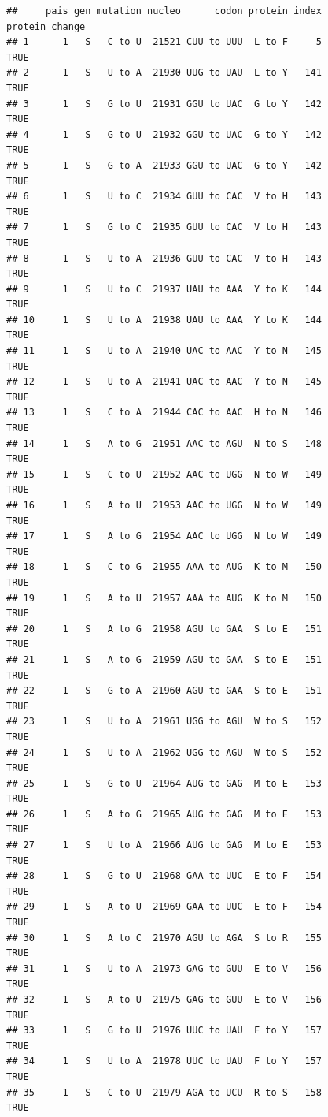 \documentclass[
  12pt,
]{article}
\begin{document}
\begin{verbatim}
##     pais gen mutation nucleo      codon protein index protein_change
## 1      1   S   C to U  21521 CUU to UUU  L to F     5           TRUE
## 2      1   S   U to A  21930 UUG to UAU  L to Y   141           TRUE
## 3      1   S   G to U  21931 GGU to UAC  G to Y   142           TRUE
## 4      1   S   G to U  21932 GGU to UAC  G to Y   142           TRUE
## 5      1   S   G to A  21933 GGU to UAC  G to Y   142           TRUE
## 6      1   S   U to C  21934 GUU to CAC  V to H   143           TRUE
## 7      1   S   G to C  21935 GUU to CAC  V to H   143           TRUE
## 8      1   S   U to A  21936 GUU to CAC  V to H   143           TRUE
## 9      1   S   U to C  21937 UAU to AAA  Y to K   144           TRUE
## 10     1   S   U to A  21938 UAU to AAA  Y to K   144           TRUE
## 11     1   S   U to A  21940 UAC to AAC  Y to N   145           TRUE
## 12     1   S   U to A  21941 UAC to AAC  Y to N   145           TRUE
## 13     1   S   C to A  21944 CAC to AAC  H to N   146           TRUE
## 14     1   S   A to G  21951 AAC to AGU  N to S   148           TRUE
## 15     1   S   C to U  21952 AAC to UGG  N to W   149           TRUE
## 16     1   S   A to U  21953 AAC to UGG  N to W   149           TRUE
## 17     1   S   A to G  21954 AAC to UGG  N to W   149           TRUE
## 18     1   S   C to G  21955 AAA to AUG  K to M   150           TRUE
## 19     1   S   A to U  21957 AAA to AUG  K to M   150           TRUE
## 20     1   S   A to G  21958 AGU to GAA  S to E   151           TRUE
## 21     1   S   A to G  21959 AGU to GAA  S to E   151           TRUE
## 22     1   S   G to A  21960 AGU to GAA  S to E   151           TRUE
## 23     1   S   U to A  21961 UGG to AGU  W to S   152           TRUE
## 24     1   S   U to A  21962 UGG to AGU  W to S   152           TRUE
## 25     1   S   G to U  21964 AUG to GAG  M to E   153           TRUE
## 26     1   S   A to G  21965 AUG to GAG  M to E   153           TRUE
## 27     1   S   U to A  21966 AUG to GAG  M to E   153           TRUE
## 28     1   S   G to U  21968 GAA to UUC  E to F   154           TRUE
## 29     1   S   A to U  21969 GAA to UUC  E to F   154           TRUE
## 30     1   S   A to C  21970 AGU to AGA  S to R   155           TRUE
## 31     1   S   U to A  21973 GAG to GUU  E to V   156           TRUE
## 32     1   S   A to U  21975 GAG to GUU  E to V   156           TRUE
## 33     1   S   G to U  21976 UUC to UAU  F to Y   157           TRUE
## 34     1   S   U to A  21978 UUC to UAU  F to Y   157           TRUE
## 35     1   S   C to U  21979 AGA to UCU  R to S   158           TRUE

\end{verbatim}
\end{document}
